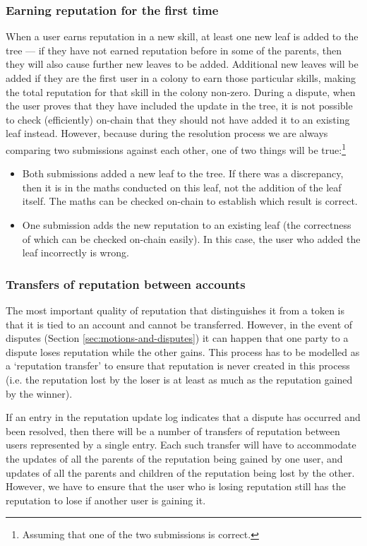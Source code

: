 \subsubsection{Earning reputation for the first time}\label{sec:earning-rep-for-first-time}
When a user earns reputation in a new skill, at least one new leaf is added to the tree --- if they have not earned reputation before in some of the parents, then they will also cause further new leaves to be added. Additional new leaves will be added if they are the first user in a colony to earn those particular skills, making the total reputation for that skill in the colony non-zero. During a dispute, when the user proves that they have included the update in the tree, it is not possible to check (efficiently) on-chain that they should not have added it to an existing leaf instead. However, because during the resolution process we are always comparing two submissions against each other, one of two things will be true:\footnote{Assuming that one of the two submissions is correct.}
\begin{itemize}
 \item Both submissions added a new leaf to the tree. If there was a discrepancy, then it is in the maths conducted on this leaf, not the addition of the leaf itself. The maths can be checked on-chain to establish which result is correct.
 \item One submission adds the new reputation to an existing leaf (the correctness of which can be checked on-chain easily). In this case, the user who added the leaf incorrectly is wrong.
\end{itemize}

\subsubsection{Transfers of reputation between accounts}\label{sec:reptransfer}

The most important quality of reputation that distinguishes it from a token is that it is tied to an account and cannot be transferred. However, in the event of disputes (Section \ref{sec:motions-and-disputes}) it can happen that one party to a dispute loses reputation while the other gains. This process has to be modelled as a `reputation transfer' to ensure that reputation is never created in this process (i.e. the reputation lost by the loser is at least as much as the reputation gained by the winner).

If an entry in the reputation update log indicates that a dispute has occurred and been resolved, then there will be a number of transfers of reputation between users represented by a single entry. Each such transfer will have to accommodate the updates of all the parents of the reputation being gained by one user, and updates of all the parents and children of the reputation being lost by the other. However, we have to ensure that the user who is losing reputation still has the reputation to lose if another user is gaining it.

